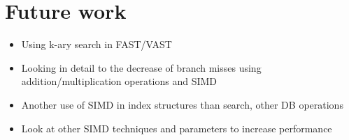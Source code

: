 \documentclass[conference]{IEEEtran}
\begin{document}

\section{Future work}
\begin{itemize}
	\item Using k-ary search in FAST/VAST
	\item Looking in detail to the decrease of branch misses using addition/multiplication operations and SIMD
	\item Another use of SIMD in index structures than search, other DB operations
	\item Look at other SIMD techniques and parameters to increase performance
\end{itemize}
\end{document}
